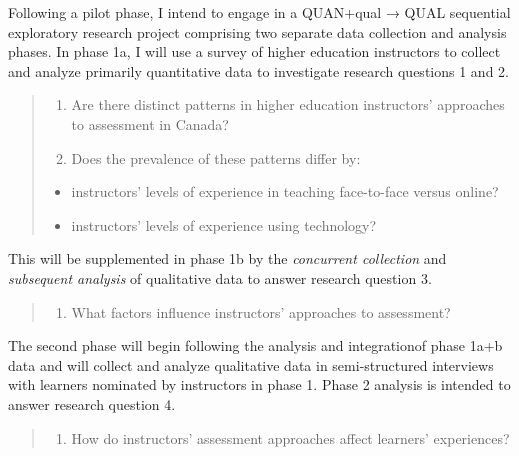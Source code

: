 \documentclass[
]{book}
\providecommand{\tightlist}{%
  \setlength{\itemsep}{0pt}\setlength{\parskip}{0pt}}
\begin{document}
Following a pilot phase, I intend to engage in a QUAN+qual → QUAL sequential exploratory research project comprising two separate data collection and analysis phases. In phase 1a, I will use a survey of higher education instructors to collect and analyze primarily quantitative data to investigate research questions 1 and 2.

\begin{quote}
\begin{enumerate}
\def\labelenumi{\arabic{enumi}.}
\tightlist
\item
  Are there distinct patterns in higher education instructors' approaches to assessment in Canada?
\item
  Does the prevalence of these patterns differ by:
\end{enumerate}

\begin{itemize}
\tightlist
\item
  instructors' levels of experience in teaching face-to-face versus online?
\item
  instructors' levels of experience using technology?
\end{itemize}
\end{quote}

This will be supplemented in phase 1b by the \emph{concurrent collection} and \emph{subsequent analysis} of qualitative data to answer research question 3.

\begin{quote}
\begin{enumerate}
\def\labelenumi{\arabic{enumi}.}
\setcounter{enumi}{2}
\tightlist
\item
  What factors influence instructors' approaches to assessment?
\end{enumerate}
\end{quote}

The second phase will begin following the analysis and integrationof phase 1a+b data and will collect and analyze qualitative data in semi-structured interviews with learners nominated by instructors in phase 1. Phase 2 analysis is intended to answer research question 4.

\begin{quote}
\begin{enumerate}
\def\labelenumi{\arabic{enumi}.}
\setcounter{enumi}{3}
\tightlist
\item
  How do instructors' assessment approaches affect learners' experiences?
\end{enumerate}
\end{quote}
\end{document}
